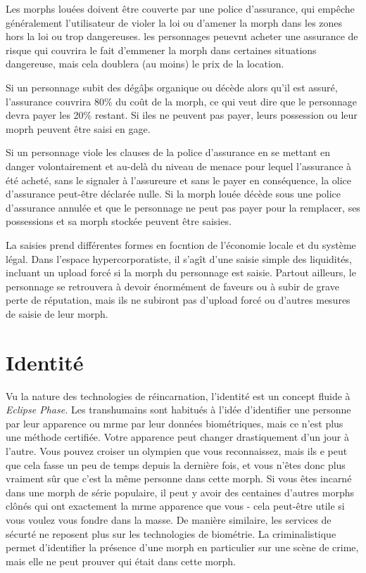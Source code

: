 Les morphs louées doivent être couverte par une police d'assurance, qui empêche généralement l'utilisateur de violer la loi ou d'amener la morph dans les zones hors la loi ou trop dangereuses. les personnages peuevnt acheter une assurance de risque qui couvrira le fait d'emmener la morph dans certaines situations dangereuse, mais cela doublera (au moins) le prix de la location. 

Si un personnage subit des dégâþs organique ou décède alors qu'il est assuré, l'assurance couvrira 80\% du coût de la morph, ce qui veut dire que le personnage devra payer les 20\% restant. Si iles ne peuvent pas payer, leurs possession ou leur moprh peuvent être saisi en gage. 

Si un personnage viole les clauses de la police d'assurance en se mettant en danger volontairement et au-delà du niveau de menace pour lequel l'assurance à été acheté, sans le signaler à l'assureure et sans le payer en conséquence, la olice d'assurance peut-être déclarée nulle. Si la morph louée décède sous une police d'assurance annulée et que le personnage ne peut pas payer pour la remplacer, ses possessions et sa morph stockée peuvent être saisies. 

La saisies prend différentes formes en focntion de l'économie locale et du système légal. Dans l'espace hypercorporatiste, il s'agît d'une saisie simple des liquidités, incluant un upload forcé si la morph du personnage est saisie. Partout ailleurs, le personnage se retrouvera à devoir énormément de faveurs ou à subir de grave perte de réputation, mais ils ne subiront pas d'upload forcé ou d'autres mesures de saisie de leur morph. 

\section{Identité} 

Vu la nature des technologies de réincarnation, l'identité est un concept fluide à \textit{Eclipse Phase.} Les transhumains sont habitués à l'idée d'identifier une personne par leur apparence ou mrme par leur données biométriques, mais ce n'est plus une méthode certifiée. Votre apparence peut changer drastiquement d'un jour à l'autre. Vous pouvez croiser un olympien que vous reconnaissez, mais ils e peut que cela fasse un peu de temps depuis la dernière fois, et vous n'êtes donc plus vraiment sûr que c'est la même personne dans cette morph. Si vous êtes incarné dans une morph de série populaire, il peut y avoir des centaines d'autres morphs clônés qui ont exactement la mrme apparence que vous - cela peut-être utile si vous voulez vous fondre dans la masse. De manière similaire, les services de sécurté ne reposent plus sur les technologies de biométrie. La criminalistique permet d'identifier la présence d'une morph en particulier sur une scène de crime, mais elle ne peut prouver qui était dans cette morph. 

